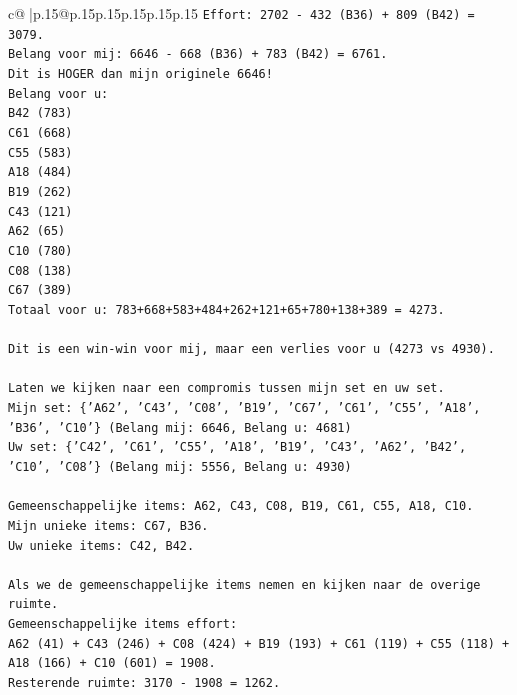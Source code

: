 \documentclass{article}
\begin{document}
{\begin{supertabular}{c@{$\;$}|p{.15\linewidth}@{}p{.15\linewidth}p{.15\linewidth}p{.15\linewidth}p{.15\linewidth}p{.15\linewidth}}
{{{\texttt{Effort: 2702 {-} 432 (B36) + 809 (B42) = 3079.} \\
\texttt{Belang voor mij: 6646 {-} 668 (B36) + 783 (B42) = 6761.} \\
\texttt{Dit is HOGER dan mijn originele 6646!} \\
\texttt{Belang voor u:} \\
\texttt{B42 (783)} \\
\texttt{C61 (668)} \\
\texttt{C55 (583)} \\
\texttt{A18 (484)} \\
\texttt{B19 (262)} \\
\texttt{C43 (121)} \\
\texttt{A62 (65)} \\
\texttt{C10 (780)} \\
\texttt{C08 (138)} \\
\texttt{C67 (389)} \\
\texttt{Totaal voor u: 783+668+583+484+262+121+65+780+138+389 = 4273.} \\
\\ 
\texttt{Dit is een win{-}win voor mij, maar een verlies voor u (4273 vs 4930).} \\
\\ 
\texttt{Laten we kijken naar een compromis tussen mijn set en uw set.} \\
\texttt{Mijn set: \{'A62', 'C43', 'C08', 'B19', 'C67', 'C61', 'C55', 'A18', 'B36', 'C10'\} (Belang mij: 6646, Belang u: 4681)} \\
\texttt{Uw set: \{'C42', 'C61', 'C55', 'A18', 'B19', 'C43', 'A62', 'B42', 'C10', 'C08'\} (Belang mij: 5556, Belang u: 4930)} \\
\\ 
\texttt{Gemeenschappelijke items: A62, C43, C08, B19, C61, C55, A18, C10.} \\
\texttt{Mijn unieke items: C67, B36.} \\
\texttt{Uw unieke items: C42, B42.} \\
\\ 
\texttt{Als we de gemeenschappelijke items nemen en kijken naar de overige ruimte.} \\
\texttt{Gemeenschappelijke items effort:} \\
\texttt{A62 (41) + C43 (246) + C08 (424) + B19 (193) + C61 (119) + C55 (118) + A18 (166) + C10 (601) = 1908.} \\
\texttt{Resterende ruimte: 3170 {-} 1908 = 1262.} \\
\\ 
}}}
\end{supertabular}}
\end{document}
